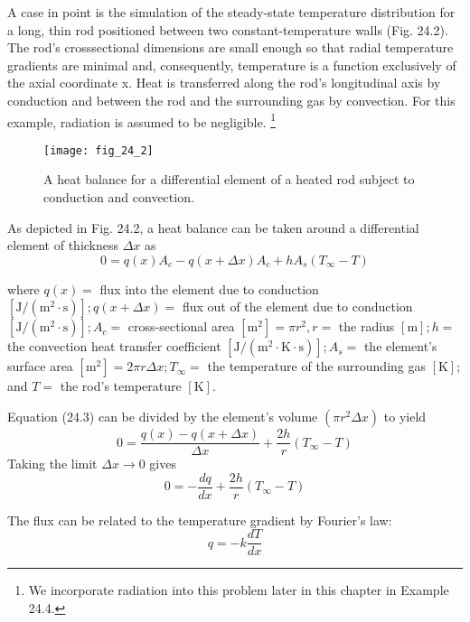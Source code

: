 \documentclass[../main.tex]{subfiles}
\begin{document}
A case in point is the simulation of the steady-state temperature distribution for a long,
thin rod positioned between two constant-temperature walls (Fig. 24.2). The rod's crosssectional dimensions are small enough so that radial temperature gradients are minimal
and, consequently, temperature is a function exclusively of the axial coordinate x. Heat is
transferred along the rod's longitudinal axis by conduction and between the rod and the
surrounding gas by convection. For this example, radiation is assumed to be negligible.
\footnote[1]{We incorporate radiation into this problem later in this chapter in Example 24.4.}

\begin{figure}[H]
    \centering
    \texttt{[image: fig\_24\_2]}
   \caption{\textsf{A heat balance for a differential element of a heated rod subject to conduction and convection.}}\label{fig:fig_24_2}
\end{figure}

As depicted in Fig. 24.2, a heat balance can be taken around a differential element of thickness $\Delta x$ as
\begin{equation}
    \tag{24.3}
    0=q(x) A_{c}-q(x+\Delta x) A_{c}+h A_{s}\left(T_{\infty}-T\right)
\end{equation}

\noindent where $q(x)=$ flux into the element due to conduction $\left[\mathrm{J} /\left(\mathrm{m}^{2} \cdot \mathrm{s}\right)\right] ; q(x+\Delta x)=$ flux out of the element due to conduction $\left[\mathrm{J} /\left(\mathrm{m}^{2} \cdot \mathrm{s}\right)\right] ; A_{c}=$ cross-sectional area
$\left[\mathrm{m}^{2}\right]=\pi r^{2}, r=$ the radius $[\mathrm{m}] ; h=$ the convection heat transfer coefficient $\left[\mathrm{J} /\left(\mathrm{m}^{2} \cdot \mathrm{K} \cdot \mathrm{s}\right)\right] ; A_{s}=$ the element's surface area $\left[\mathrm{m}^{2}\right]=2 \pi r \Delta x ; T_{\infty}=$ the temperature of the surrounding gas $[\mathrm{K}]$; and $T=$ the rod's temperature $[\mathrm{K}]$.

Equation (24.3) can be divided by the element's volume $\left(\pi r^{2} \Delta x\right)$ to yield
$$
0=\frac{q(x)-q(x+\Delta x)}{\Delta x}+\frac{2 h}{r}\left(T_{\infty}-T\right)
$$
Taking the limit $\Delta x \rightarrow 0$ gives
\begin{equation}
    \tag{24.4}
    0=-\frac{d q}{d x}+\frac{2 h}{r}\left(T_{\infty}-T\right)
\end{equation}

\noindent The flux can be related to the temperature gradient by Fourier's law:
\begin{equation}
    \tag{24.5}
    q=-k \frac{d T}{d x}
\end{equation}
\end{document}

